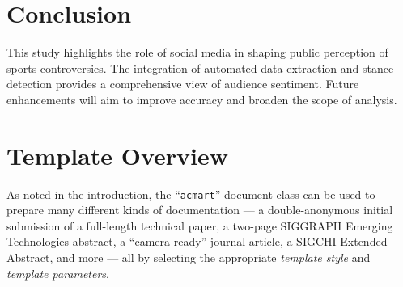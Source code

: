 \documentclass[sigconf, review]{acmart}
\begin{document}
    




\section{Conclusion}
This study highlights the role of social media in shaping public perception of sports controversies. The integration of automated data extraction and stance detection provides a comprehensive view of audience sentiment. Future enhancements will aim to improve accuracy and broaden the scope of analysis.



\section{Template Overview}
As noted in the introduction, the ``\verb|acmart|'' document class can
be used to prepare many different kinds of documentation --- a
double-anonymous initial submission of a full-length technical paper, a
two-page SIGGRAPH Emerging Technologies abstract, a ``camera-ready''
journal article, a SIGCHI Extended Abstract, and more --- all by
selecting the appropriate {\itshape template style} and {\itshape
  template parameters}.
\end{document}
